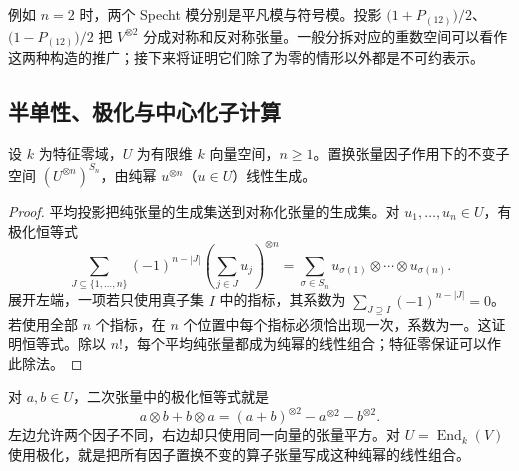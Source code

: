 \ProseParagraphBreak
例如 \(n=2\) 时，两个 Specht 模分别是平凡模与符号模。投影 \(\bigl(1+P_{(12)}\bigr)/2\)、\(\bigl(1-P_{(12)}\bigr)/2\) 把 \(V^{\otimes2}\) 分成对称和反对称张量。一般分拆对应的重数空间可以看作这两种构造的推广；接下来将证明它们除了为零的情形以外都是不可约表示。

\subsection{半单性、极化与中心化子计算}
\label{b5:subsec:0703:04}

\begin{lemma}[极化]\label{b5:lem:tensor-polarization}
	设 \(k\) 为特征零域，\(U\) 为有限维 \(k\) 向量空间，\(n\ge1\)。置换张量因子作用下的不变子空间 \((U^{\otimes n})^{S_n}\)，由纯幂 \(u^{\otimes n}\)（\(u\in U\)）线性生成。
\end{lemma}
\begin{proof}
	平均投影把纯张量的生成集送到对称化张量的生成集。对 \(u_1,\ldots,u_n\in U\)，有极化恒等式
	\[
		\sum_{J\subseteq\{1,\ldots,n\}}(-1)^{n-|J|} \left(\sum_{j\in J}u_j\right)^{\otimes n} =\sum_{\sigma\in S_n}u_{\sigma(1)}\otimes\cdots\otimes u_{\sigma(n)}.
	\]
	展开左端，一项若只使用真子集 \(I\) 中的指标，其系数为 \(\sum_{J\supseteq I}(-1)^{n-|J|}=0\)。若使用全部 \(n\) 个指标，在 \(n\) 个位置中每个指标必须恰出现一次，系数为一。这证明恒等式。除以 \(n!\)，每个平均纯张量都成为纯幂的线性组合；特征零保证可以作此除法。
\end{proof}

对 \(a,b\in U\)，二次张量中的极化恒等式就是
\[
	a\otimes b+b\otimes a =(a+b)^{\otimes2}-a^{\otimes2}-b^{\otimes2}.
\]
左边允许两个因子不同，右边却只使用同一向量的张量平方。对 \(U=\operatorname{End}_k(V)\) 使用极化，就是把所有因子置换不变的算子张量写成这种纯幂的线性组合。

